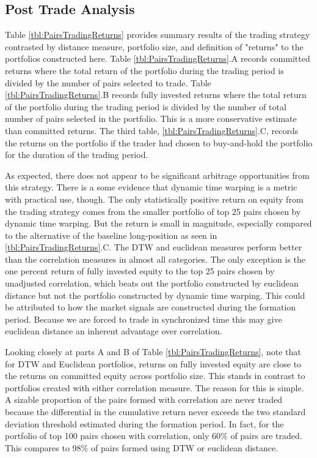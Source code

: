 \subsection{Post Trade Analysis}

Table \ref{tbl:PairsTradingReturns} provides summary results of the trading strategy contrasted by distance measure, portfolio size, and definition of "returns" to the portfolios constructed here. Table \ref{tbl:PairsTradingReturns}.A records committed returns where the total return of the portfolio during the trading period is divided by the number of pairs selected to trade. Table \ref{tbl:PairsTradingReturns}.B records fully invested returns where the total return of the portfolio during the trading period is divided by the number of total number of pairs selected in the portfolio. This is a more conservative estimate than committed returns. The third table, \ref{tbl:PairsTradingReturns}.C, records the returns on the portfolio if the trader had chosen to buy-and-hold the portfolio for the duration of the trading period.

As expected, there does not appear to be significant arbitrage opportunities from this strategy. There is a some evidence that dynamic time warping is a metric with practical use, though. The only statistically positive return on equity from the trading strategy comes from the smaller portfolio of top 25 pairs chosen by dynamic time warping. But the return is small in magnitude, especially compared to the alternative of the baseline long-position as seen in \ref{tbl:PairsTradingReturns}.C. The DTW and euclidean measures perform better than the correlation measures in almost all categories. The only exception is the one percent return of fully invested equity to the top 25 pairs chosen by unadjusted correlation, which beats out the portfolio constructed by euclidean distance but not the portfolio constructed by dynamic time warping. This could be attributed to how the market signals are constructed during the formation period. Because we are forced to trade in synchronized time this may give euclidean distance an inherent advantage over correlation.

Looking closely at parts A and B of Table \ref{tbl:PairsTradingReturns}, note that for DTW and Euclidean portfolios, returns on fully invested equity are close to the returns on committed equity across portfolio size. This stands in contrast to portfolios created with either correlation measure. The reason for this is simple. A sizable proportion of the pairs formed with correlation are never traded because the differential in the cumulative return never exceeds the two standard deviation threshold estimated during the formation period. In fact, for the portfolio of top 100 pairs chosen with correlation, only 60\% of pairs are traded. This compares to 98\% of pairs formed using DTW or euclidean distance.

